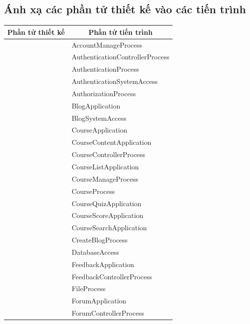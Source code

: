 \documentclass[./../main.tex]{subfiles}
\begin{document}
	\subsection{Ánh xạ các phần tử thiết kế vào các tiến trình}
	\begin{longtable}{|p{}|p{}|}
		\hline
		\multicolumn{1}{|c|}{\textbf{Phần tử thiết kế}} & \multicolumn{1}{c|}{\textbf{Phần tử tiến trình}} \\ \hline
		\endfirsthead
		\endhead
		& AccountManageProcess        \\ \hline
		& AuthenticationControllerProcess                  \\ \hline
		& AuthenticationProcess       \\ \hline
		& AuthenticationSystemAccess  \\ \hline
		& AuthorizationProcess        \\ \hline
		& BlogApplication             \\ \hline
		& BlogSystemAccess            \\ \hline
		& CourseApplication           \\ \hline
		& CourseContentApplication    \\ \hline
		& CourseControllerProcess     \\ \hline
		& CourseListApplication       \\ \hline
		& CourseManageProcess         \\ \hline
		& CourseProcess               \\ \hline
		& CourseQuizApplication       \\ \hline
		& CourseScoreApplication      \\ \hline
		& CourseSearchApplication     \\ \hline
		& CreateBlogProcess           \\ \hline
		& DatabaseAccess              \\ \hline
		& FeedbackApplication         \\ \hline
		& FeedbackControllerProcess   \\ \hline
		& FileProcess                 \\ \hline
		& ForumApplication            \\ \hline
		& ForumControllerProcess      \\ \hline

\end{longtable}
\end{document}

